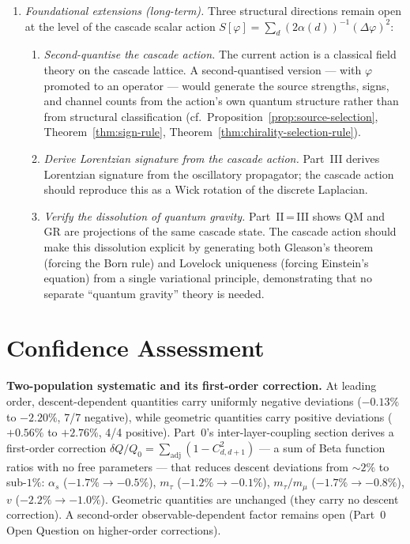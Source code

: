 \documentclass[12pt,a4paper]{article}
\begin{document}
\begin{enumerate}
\item \emph{Foundational extensions (long-term).} Three structural directions remain open at the level of the cascade scalar action $S[\varphi]=\sum_d(2\alpha(d))^{-1}(\Delta\varphi)^2$:
\begin{enumerate}[label=(\alph*),nosep]
\item \emph{Second-quantise the cascade action.} The current action is a classical field theory on the cascade lattice. A second-quantised version --- with $\varphi$ promoted to an operator --- would generate the source strengths, signs, and channel counts from the action's own quantum structure rather than from structural classification (cf.\ Proposition~\ref{prop:source-selection}, Theorem~\ref{thm:sign-rule}, Theorem~\ref{thm:chirality-selection-rule}).
\item \emph{Derive Lorentzian signature from the cascade action.} Part~III derives Lorentzian signature from the oscillatory propagator; the cascade action should reproduce this as a Wick rotation of the discrete Laplacian.
\item \emph{Verify the dissolution of quantum gravity.} Part~II\,=\,III shows QM and GR are projections of the same cascade state. The cascade action should make this dissolution explicit by generating both Gleason's theorem (forcing the Born rule) and Lovelock uniqueness (forcing Einstein's equation) from a single variational principle, demonstrating that no separate ``quantum gravity'' theory is needed.
\end{enumerate}
\end{enumerate}

\section{Confidence Assessment}\label{sec:confidence-assessment}

\textbf{Two-population systematic and its first-order correction.} At leading order, descent-dependent quantities carry uniformly negative deviations ($-0.13\%$ to $-2.20\%$, 7/7 negative), while geometric quantities carry positive deviations ($+0.56\%$ to $+2.76\%$, 4/4 positive). Part~0's inter-layer-coupling section derives a first-order correction $\delta Q/Q_0 = \sum_{\mathrm{adj}}(1-C_{d,d+1}^2)$ --- a sum of Beta function ratios with no free parameters --- that reduces descent deviations from $\sim\!2\%$ to sub-$1\%$: $\alpha_s$ ($-1.7\% \to -0.5\%$), $m_\tau$ ($-1.2\% \to -0.1\%$), $m_\tau/m_\mu$ ($-1.7\% \to -0.8\%$), $v$ ($-2.2\% \to -1.0\%$). Geometric quantities are unchanged (they carry no descent correction). A second-order observable-dependent factor remains open (Part~0 Open Question on higher-order corrections).
\end{document}
